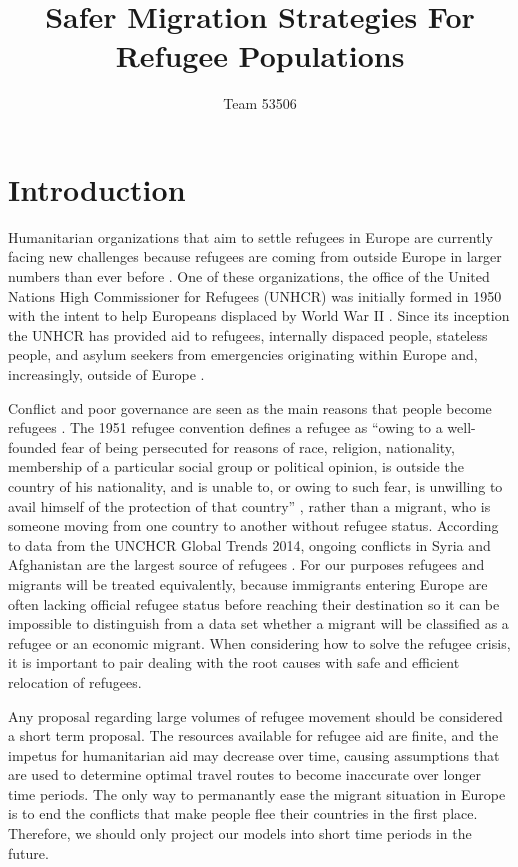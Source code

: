\documentclass{article}
\title{Safer Migration Strategies For Refugee Populations}
\author{Team 53506}
\begin{document}

\maketitle
\tableofcontents
\newpage


\section{Introduction}

Humanitarian organizations that aim to settle refugees in Europe are currently facing new challenges because refugees are coming from outside Europe in larger numbers than ever before \cite{simpson}. One of these organizations, the office of the United Nations High Commissioner for Refugees (UNHCR) was initially formed in 1950 with the intent to help Europeans displaced by World War II \cite{historyUNHCR}. Since its inception the UNHCR has provided aid to refugees, internally dispaced people, stateless people, and asylum seekers from emergencies originating within Europe and, increasingly, outside of Europe \cite{historyUNHCR}.

Conflict and poor governance are seen as the main reasons that people become refugees \cite{simpson}. The 1951 refugee convention defines a refugee as ``owing to a well-founded fear of being persecuted for reasons of race, religion, nationality, membership of a particular social group or political opinion, is outside the country of his nationality, and is unable to, or owing to such fear, is unwilling to avail himself of the protection of that country'' \cite{1951convention}, rather than a migrant, who is someone moving from one country to another without refugee status. According to data from the UNCHCR Global Trends 2014, ongoing conflicts in Syria and Afghanistan are the largest source of refugees \cite{refugeefactsheet}. For our purposes refugees and migrants will be treated equivalently, because immigrants entering Europe are often lacking official refugee status before reaching their destination so it can be impossible to distinguish from a data set whether a migrant will be classified as a refugee or an economic migrant. When considering how to solve the refugee crisis, it is important to pair dealing with the root causes with safe and efficient relocation of refugees.

Any proposal regarding large volumes of refugee movement should be considered a short term proposal. The resources available for refugee aid are finite, and the impetus for humanitarian aid may decrease over time, causing assumptions that are used to determine optimal travel routes to become inaccurate over longer time periods. The only way to permanantly ease the migrant situation in Europe is to end the conflicts that make people flee their countries in the first place. Therefore, we should only project our models into short time periods in the future.
\end{document}
